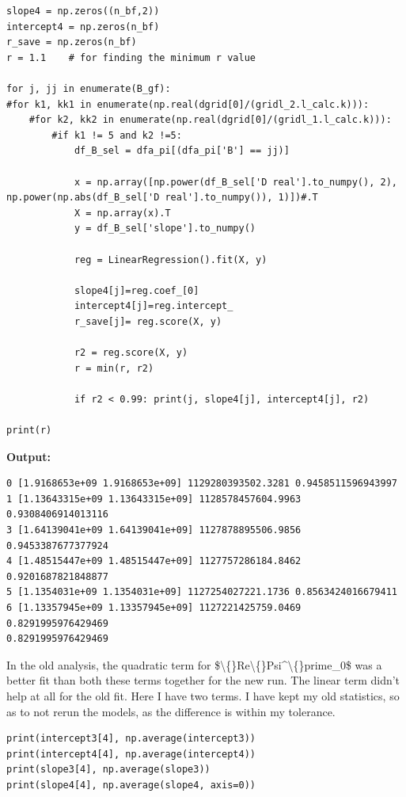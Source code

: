 \documentclass{article}
\begin{document}
\begin{lstlisting}
slope4 = np.zeros((n_bf,2))
intercept4 = np.zeros(n_bf)
r_save = np.zeros(n_bf)
r = 1.1    # for finding the minimum r value

for j, jj in enumerate(B_gf):
#for k1, kk1 in enumerate(np.real(dgrid[0]/(gridl_2.l_calc.k))):
    #for k2, kk2 in enumerate(np.real(dgrid[0]/(gridl_1.l_calc.k))):
        #if k1 != 5 and k2 !=5:
            df_B_sel = dfa_pi[(dfa_pi['B'] == jj)]

            x = np.array([np.power(df_B_sel['D real'].to_numpy(), 2), np.power(np.abs(df_B_sel['D real'].to_numpy()), 1)])#.T
            X = np.array(x).T
            y = df_B_sel['slope'].to_numpy()

            reg = LinearRegression().fit(X, y)

            slope4[j]=reg.coef_[0]
            intercept4[j]=reg.intercept_
            r_save[j]= reg.score(X, y)

            r2 = reg.score(X, y)
            r = min(r, r2)

            if r2 < 0.99: print(j, slope4[j], intercept4[j], r2)

print(r)\end{lstlisting}

\textbf{Output:}\begin{verbatim}
0 [1.9168653e+09 1.9168653e+09] 1129280393502.3281 0.9458511596943997
1 [1.13643315e+09 1.13643315e+09] 1128578457604.9963 0.9308406914013116
3 [1.64139041e+09 1.64139041e+09] 1127878895506.9856 0.9453387677377924
4 [1.48515447e+09 1.48515447e+09] 1127757286184.8462 0.9201687821848877
5 [1.1354031e+09 1.1354031e+09] 1127254027221.1736 0.8563424016679411
6 [1.13357945e+09 1.13357945e+09] 1127221425759.0469 0.8291995976429469
0.8291995976429469

\end{verbatim}

In the old analysis, the quadratic term for \$\textbackslash\{\}Re\textbackslash\{\}Psi\textasciicircum{}\textbackslash\{\}prime\_0\$ was a better fit than both these terms together for the new run. The linear term didn't help at all for the old fit. Here I have two terms. I have kept my old statistics, so as to not rerun the models, as the difference is within my tolerance. 

\begin{lstlisting}
print(intercept3[4], np.average(intercept3))
print(intercept4[4], np.average(intercept4))
print(slope3[4], np.average(slope3))
print(slope4[4], np.average(slope4, axis=0))\end{lstlisting}
\end{document}
